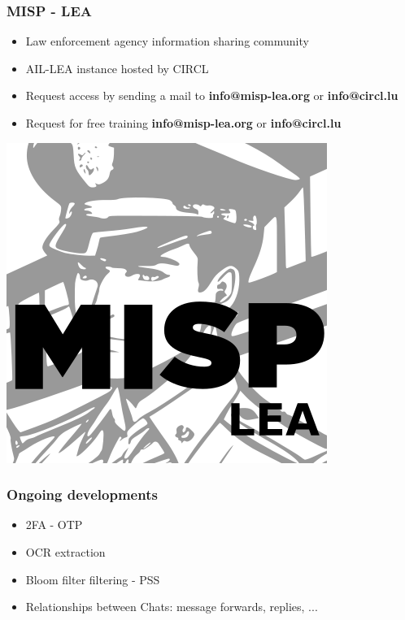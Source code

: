\documentclass{beamer}
\begin{document}
\begin{frame}
    \frametitle{{\bf MISP - LEA}}
		\begin{itemize}
    		\item Law enforcement agency information sharing community
    		\item AIL-LEA instance hosted by CIRCL
    		\item Request access by sending a mail to {\bf info@misp-lea.org} or {\bf info@circl.lu}
    		\item Request for free training {\bf info@misp-lea.org} or {\bf info@circl.lu}
		\end{itemize}
    	\begin{center}
        	\includegraphics[scale=0.3]{images/misp-lea.png}
    	\end{center}
\end{frame}



\begin{frame}
	\frametitle{Ongoing developments}
        \begin{itemize}
			\item 2FA - OTP
            \item OCR extraction
			\item Bloom filter filtering - PSS
        	\item Relationships between Chats: message forwards, replies, ...
        \end{itemize}
\end{frame}
\end{document}
